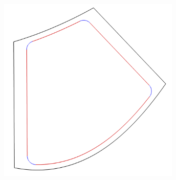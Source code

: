 \documentclass[8pt, aspectratio=169]{beamer}
\begin{document}
\begin{frame}
\begin{minipage}{\textwidth}
\begin{figure}[H]
\begin{subfigure}{.3\textwidth}
			\end{subfigure}
			\begin{subfigure}{.3\textwidth}
				\includegraphics[width=\textwidth]{../tec/chambers/13.png}
			\end{subfigure}
		\end{figure}
	\end{minipage}
\end{frame}
\end{document}
